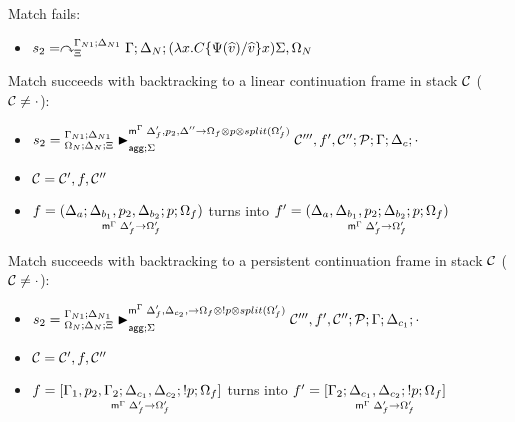 
\item Match fails:
\begin{itemize}[leftmargin=\secondm]
   \item $s_2 = \derstatex{\Gamma}{\Delta_N}{\Xi}{\Gamma_{N1}}{\Delta_{N1}}
{(\lambda x.  C\{\Psi(\widehat{v})/\widehat{v}\} x) \Sigma,
   \Omega_N}$
\end{itemize}

\item Match succeeds with backtracking to a linear continuation frame in
stack $\lstack{C}$ ($\lstack{C} \neq \cdot$):

\begin{itemize}[leftmargin=\secondm]
   \item $s_2 = \matstatea{\Delta_N}{\lstack{C'''}, f', \lstack{C''};
                  \lstack{P}}{\Gamma}{\Delta_c}{\cdot}
               {\Delta'_f, p_2, \Delta'' \rightarrow \Omega_f \otimes p
                  \otimes split(\Omega'_f)}{\Sigma}$

   \item $\lstack{C} = \lstack{C'}, f, \lstack{C''}$
   \item $f = \lframe{\Delta_a}{\Delta_{b_1}, p_2,
         \Delta_{b_2}}{p}{\Omega_f}{\Delta_f'}{\Omega'_f}$
         turns into
         $f' = \lframe{\Delta_a, \Delta_{b_1}, p_2}
            {\Delta_{b_2}}{p}{\Omega_f}{\Delta'_f}{\Omega'_f}$
\end{itemize}

\item Match succeeds with backtracking to a persistent continuation frame
in stack $\lstack{C}$ ($\lstack{C} \neq \cdot$):
\begin{itemize}[leftmargin=\secondm]
   \item $s_2 = \matstatea{\Delta_N}{\lstack{C'''}, f', \lstack{C''};
      \lstack{P}}{\Gamma}{\Delta_{c_1}}{\cdot}{\Delta'_f, \Delta_{c_2}, 
         \rightarrow \Omega_f \otimes \bang p \otimes split(\Omega'_f)}{\Sigma}$

   \item $\lstack{C} = \lstack{C'}, f, \lstack{C''}$

   \item $f = \pframe{\Gamma_1, p_2,
      \Gamma_2}{\Delta_{c_1}, \Delta_{c_2}}{\bang p}{\Omega_f}{\Delta'_f}{\Omega'_f}$
   turns into $f' = \pframe{\Gamma_2}{\Delta_{c_1},
      \Delta_{c_2}}{\bang p}{\Omega_f}{\Delta'_f}{\Omega'_f}$

\end{itemize}

